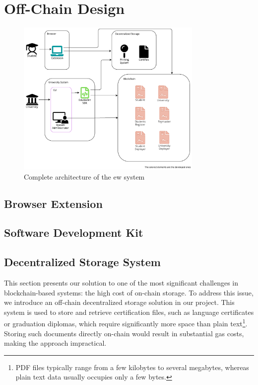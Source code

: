 \chapter{Off-Chain Design}


\begin{figure}[htpb]
  \centering
  \includegraphics[width=0.8\textwidth]{figures/Architecture diagram complete.pdf}
  \caption[System architecture diagram]{Complete architecture of the \acrlong{ew} system}
  \label{fig:fullArchDiag}
\end{figure}

\section{Browser Extension}
\label{sec:browserExtensionDesign}

\section{Software Development Kit}
\label{sec:sdkDesign}

\section{Decentralized Storage System}
\label{sec:decStorageDesgn}
This section presents our solution to one of the most significant challenges in blockchain-based systems: the high cost of on-chain storage. To address this issue, we introduce an off-chain decentralized storage solution in our project. This system is used to store and retrieve certification files, such as language certificates or graduation diplomas, which require significantly more space than plain text\footnote{PDF files typically range from a few kilobytes to several megabytes, whereas plain text data usually occupies only a few bytes.}. Storing such documents directly on-chain would result in substantial gas costs, making the approach impractical. 

